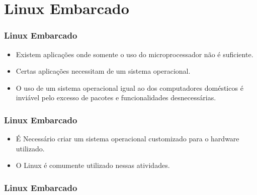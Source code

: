 \section{Linux Embarcado}

\begin{frame}
    \frametitle{Linux Embarcado}
    \begin{itemize}
        \item Existem aplicações onde somente o uso do 
        microprocessador não é suficiente.
        \item Certas aplicações necessitam de um sistema
        operacional.
        \item O uso de um sistema operacional igual ao dos
        computadores domésticos é inviável pelo excesso de 
        pacotes e funcionalidades desnecessárias.
    \end{itemize}
    

\end{frame}

\begin{frame}
    \frametitle{Linux Embarcado}
    \begin{itemize}
        \item É Necessário criar um sistema operacional customizado
        para o hardware utilizado.
        \item O Linux é comumente utilizado nessas atividades. 
    \end{itemize}
\end{frame}

\begin{frame}
    \frametitle{Linux Embarcado}

    

\end{frame}